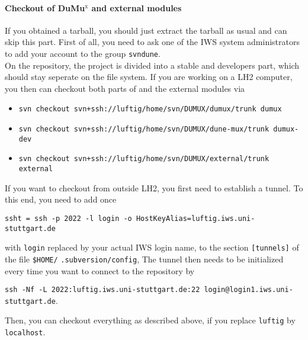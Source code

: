 \paragraph{Checkout of DuMu$^\text{x}$ and external modules} 
If you obtained a \Dumux tarball, you should just extract the tarball as usual 
and can skip this part. First of all, you need to ask one of the IWS system administrators to 
add your account to the group \texttt{svndune}. \\
On the repository, the \Dumux project is divided into a stable and developers part, which should stay seperate
on the file system. If you are working on a LH2 computer, you then can checkout both parts of \Dumux
and the external modules via 
\begin{itemize}
\item \texttt{svn checkout svn+ssh://luftig/home/svn/DUMUX/dumux/trunk dumux}
\item \texttt{svn checkout svn+ssh://luftig/home/svn/DUMUX/dune-mux/trunk dumux-dev}
\item \texttt{svn checkout svn+ssh://luftig/home/svn/DUMUX/external/trunk external}
\end{itemize} 
If you want to checkout from outside LH2, you first need to establish a tunnel. 
To this end, you need to add once 
\begin{center}
\texttt{ssht = ssh -p 2022 -l login -o HostKeyAlias=luftig.iws.uni-stuttgart.de} 
\end{center}
with \texttt{login} replaced 
by your actual IWS login name, to the section \texttt{[tunnels]} of the 
file \texttt{\$HOME/} \texttt{.subversion/config}, 
The tunnel then needs to be initialized every time you want 
to connect to the repository by 
\begin{center}
\texttt{ssh -Nf -L 2022:luftig.iws.uni-stuttgart.de:22 login@login1.iws.uni-stuttgart.de}.
\end{center}
Then, you can checkout everything as described above, if you replace \texttt{luftig} 
by \texttt{localhost}. 


